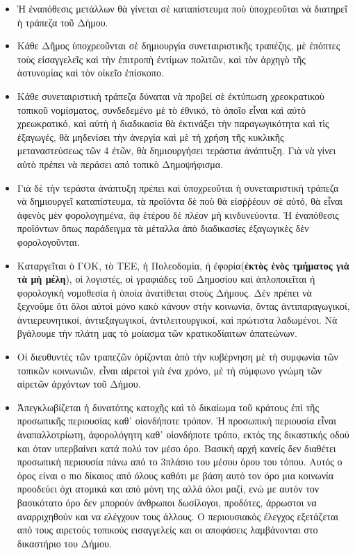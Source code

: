 \documentclass[a4paper]{article}
\begin{document}
\begin{itemize}
\item Ἡ ἐναπόθεσις μετάλλων θὰ γίνεται σὲ καταπίστευμα ποὺ ὑποχρεοῦται νὰ διατηρεῖ ἡ τράπεζα τοῦ Δήμου.
\item Κάθε Δῆμος ὑποχρεοῦνται σὲ δημιουργία συνεταιριστικῆς τραπέζης, μὲ ἐπόπτες τοὺς εἰσαγγελεῖς καὶ τὴν ἐπιτροπὴ ἐντίμων πολιτῶν, καὶ τὸν ἀρχηγὸ τῆς ἀστυνομίας καὶ τὸν οἰκεῖο ἐπίσκοπο.
\item Κάθε συνεταιριστικὴ τράπεζα δύναται νὰ προβεὶ σὲ ἐκτύπωση χρεοκρατικοὺ τοπικοῦ νομίσματος, συνδεδεμένο μὲ τὸ ἐθνικό, τὸ ὁποῖο εἶναι καὶ αὐτὸ χρεωκρατικό, καὶ αὐτὴ ἡ διαδικασία θὰ ἐκτινάξει τὴν παραγωγικότητα καὶ τὶς ἐξαγωγές, θὰ μηδενίσει τὴν ἀνεργία καὶ μὲ τὴ χρήση τῆς κυκλικῆς μεταναστεύσεως τῶν 4 ἐτῶν, θὰ δημιουργήσει τεράστια ἀνάπτυξη. Γιὰ νὰ γίνει αὐτὸ πρέπει νὰ περάσει από τοπικὸ Δημοψήφισμα.
\item Γιὰ δὲ τὴν τεράστα ἀνάπτυξη πρέπει καὶ ὑποχρεοῦται ἡ συνεταιριστικὴ τράπεζα νὰ δημιουργεῖ καταπίστευμα, τὰ προϊόντα δὲ ποὺ θὰ εἰσῤῥέουν σὲ αὐτό, θὰ εἶναι ἀφενὸς μὲν φορολογημένα, ἂφ ἑτέρου δὲ πλέον μὴ κινδυνεύοντα. Ἡ ἐναπόθεσις προϊόντων ὅπως παράδειγμα τὰ μέταλλα ἀπὸ διαδικασίες ἐξαγωγικὲς δὲν φορολογοῦνται.
\item Καταργεῖται ὁ ΓΟΚ, τὸ ΤΕΕ, ἡ Πολεοδομία, ἡ ἐφορία(\textbf{ἐκτὸς ἑνὸς τμήματος γιὰ τὰ μὴ μέλη}), οἱ λογιστές, οἱ γραφιάδες τοῦ Δημοσίου καὶ ἁπλοποιεῖται ἡ φορολογικὴ νομοθεσία ἡ ὁποία ἀνατίθεται στοὺς Δήμους. Δὲν πρέπει νὰ ξεχνοῦμε ὅτι ὅλοι αὐτοὶ μόνο κακὸ κάνουν στὴν κοινωνία, ὄντας ἀντιπαραγωγικοί, ἀντιερευνητικοί, ἀντιεξαγωγικοί, ἀντιλειτουργικοί, καὶ πρώτιστα λαδωμένοι. Νὰ βγάλουμε τὴν πλάτη μας τὸ μοίασμα τῶν κρατικοδίαιτων ἀπατεώνων.
\item Οἱ διευθυντὲς τῶν τραπεζῶν ὁρίζονται ἀπὸ τὴν κυβέρνηση μὲ τὴ συμφωνία τῶν τοπικῶν κοινωνιῶν, εἶναι αἱρετοὶ γιὰ ένα χρόνο, μὲ τὴ σύμφωνο γνώμη τῶν αἱρετῶν ἀρχόντων τοῦ Δήμου.
\item Ἀπεγκλωβίζεται ἡ δυνατότης κατοχῆς καὶ τὸ δικαίωμα τοῦ κράτους ἐπὶ τῆς προσωπικῆς περιουσίας καθ᾿ οἱονδήποτε τρόπον. Ἡ προσωπικὴ περιουσία εἶναι ἀναπαλλοτρίωτη, ἀφορολόγητη καθ᾿ οἱονδήποτε τρόπο, εκτός της δικαστικής οδού και όταν υπερβαίνει κατά πολύ τον μέσο όρο. Βασική αρχή κανείς δεν διαθέτει προσωπική περιουσία πάνω από το 3πλάσιο του μέσου όρου του τόπου. Αυτός ο όρος είναι ο πιο δίκαιος από όλους καθότι με βάση αυτό τον όρο μια κοινωνία προοδεύει όχι ατομικά και από μόνη της αλλά όλοι μαζί, ενώ με αυτόν τον βασικότατο όρο δεν μπορούν άνθρωποι δωσίλογοι, προδότες, άρρωστοι να αναρριχηθούν και να ελέγχουν τους άλλους. Ο περιουσιακός έλεγχος εξετάζεται από τους αιρετούς τοπικούς εισαγγελείς και οι αποφάσεις λαμβάνονται στο δικαστήριο του Δήμου.

\end{itemize}
\end{document}
